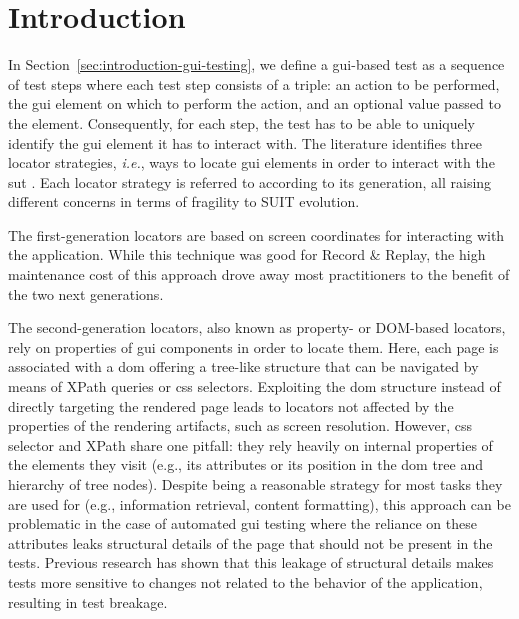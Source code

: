 \section{Introduction}
\label{sec:hpath-introduction}

In Section~\ref{sec:introduction-gui-testing}, we define a \gls{gui}-based test as a sequence of test steps where each test step consists of a triple: an action to be performed, the \gls{gui} element on which to perform the action, and an optional value passed to the element. Consequently, for each step, the test has to be able to uniquely identify the \gls{gui} element it has to interact with. The literature identifies three locator strategies, \emph{i.e.}, ways to locate \gls{gui} elements in order to interact with the \gls{sut} \cite{Bosch2014, Leotta2018}. Each locator strategy is referred to according to its generation, all raising different concerns in terms of fragility to SUIT evolution. 

The first-generation locators are based on screen coordinates for interacting with the application. While this technique was good for Record \& Replay, the high maintenance cost of this approach drove away most practitioners to the benefit of the two next generations.

The second-generation locators, also known as property- or DOM-based locators, rely on properties of \gls{gui} components in order to locate them. Here, each page is associated with a \gls{dom} offering a tree-like structure that can be navigated by means of XPath queries or \gls{css} selectors. Exploiting the \gls{dom} structure instead of directly targeting the rendered page leads to locators not affected by the properties of the rendering artifacts, such as screen resolution. However, \gls{css} selector and XPath share one pitfall: they rely heavily on internal properties of the elements they visit (e.g., its attributes or its position in the \gls{dom} tree and hierarchy of tree nodes). Despite being a reasonable strategy for most tasks they are used for (e.g., information retrieval, content formatting), this approach can be problematic in the case of automated \gls{gui} testing where the reliance on these attributes leaks structural details of the page that should not be present in the tests. Previous research \cite{Thummalapenta2013, Hammoudi2016} has shown that this leakage of structural details makes tests more sensitive to changes not related to the behavior of the application, resulting in test breakage.

